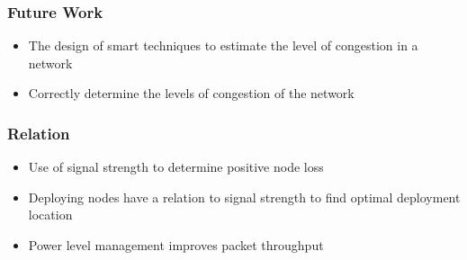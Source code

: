 \begin{frame}[t]
  \frametitle{Future Work}
  \begin{itemize}
  \item The design of smart techniques to estimate the level of congestion in a network
  \item Correctly determine the levels of congestion of the network
  \end{itemize}

  \vfill

  \begin{flushleft}
    \begin{tiny}
      \begin{minipage}{1.0\linewidth}
      \end{minipage}
    \end{tiny}
  \end{flushleft}
  
\end{frame}

\begin{frame}[t]
  \frametitle{Relation}
  \begin{itemize}
  \item Use of signal strength to determine positive node loss
  \item Deploying nodes have a relation to signal strength to find optimal deployment location
  \item Power level management improves packet throughput
  \end{itemize}

  \vfill

  \begin{flushleft}
    \begin{tiny}
      \begin{minipage}{1.0\linewidth}
      \end{minipage}
    \end{tiny}
  \end{flushleft}
  
\end{frame}

